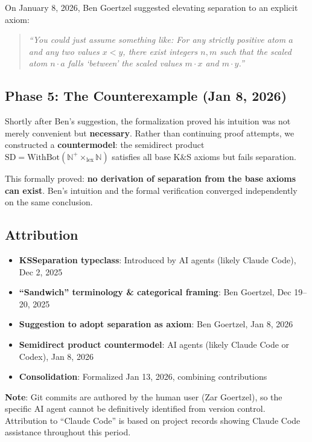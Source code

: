 \documentclass[11pt]{article}
\theoremstyle{definition}
\theoremstyle{remark}
\begin{document}
On January 8, 2026, Ben Goertzel suggested elevating separation to an explicit axiom:
\begin{quote}
\emph{``You could just assume something like: For any strictly positive atom $a$ and any two
values $x < y$, there exist integers $n, m$ such that the scaled atom $n \cdot a$ falls
`between' the scaled values $m \cdot x$ and $m \cdot y$.''}
\end{quote}

\subsection*{Phase 5: The Counterexample (Jan 8, 2026)}

Shortly after Ben's suggestion, the formalization proved his intuition was not merely
convenient but \textbf{necessary}. Rather than continuing proof attempts, we constructed
a \textbf{countermodel}: the semidirect product
$\text{SD} = \text{WithBot}(\mathbb{N}^+ \times_{\text{lex}} \mathbb{N})$
satisfies all base K\&S axioms but fails separation.

This formally proved: \textbf{no derivation of separation from the base axioms can exist}.
Ben's intuition and the formal verification converged independently on the same conclusion.

\subsection*{Attribution}

\begin{itemize}
\item \textbf{KSSeparation typeclass}: Introduced by AI agents (likely Claude Code), Dec 2, 2025
\item \textbf{``Sandwich'' terminology \& categorical framing}: Ben Goertzel, Dec 19--20, 2025
\item \textbf{Suggestion to adopt separation as axiom}: Ben Goertzel, Jan 8, 2026
\item \textbf{Semidirect product countermodel}: AI agents (likely Claude Code or Codex), Jan 8, 2026
\item \textbf{Consolidation}: Formalized Jan 13, 2026, combining contributions
\end{itemize}

\textbf{Note}: Git commits are authored by the human user (Zar Goertzel), so the specific AI
agent cannot be definitively identified from version control. Attribution to ``Claude Code''
is based on project records showing Claude Code assistance throughout this period.
\end{document}
